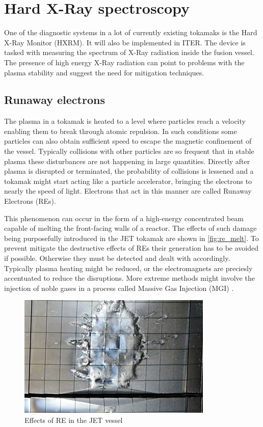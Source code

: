 \section{Hard X-Ray spectroscopy}

One of the diagnostic systems in a lot of currently existing tokamaks
is the Hard X-Ray Monitor (HXRM). It will also be implemented in ITER.
The device is tasked with measuring the spectrum of X-Ray radiation
inside the fusion vessel. The presence of high energy X-Ray
radiation can point to problems with the plasma stability and suggest the 
need for mitigation techniques.
\cite{low_noise_amplifier_for_pmt}

\subsection{Runaway electrons}

The plasma in a tokamak is heated to a level where particles reach a velocity
enabling them to break through atomic repulsion. In such conditions some 
particles can also obtain sufficient speed to escape the magnetic confinement
of the vessel. Typically collisions with other particles are so frequent
that in stable plasma these disturbances are not happening in large quantities.
Directly after plasma is disrupted or terminated, 
the probability of collisions is lessened 
and a tokamak might start acting like a particle accelerator,
bringing the electrons to nearly the speed of light.
Electrons that act in this manner are called Runaway Electrons (REs).
\cite{iter_re_melt}


This phenomenon can occur in the form of a high-energy 
concentrated beam capable of melting the front-facing walls of a reactor.
The effects of such damage being purposefully introduced in the JET tokamak
are shown in \autoref{fig:re_melt}. To prevent mitigate the destructive
effects of REs their generation has to be avoided if possible. Otherwise
they must be detected and dealt with accordingly. Typically plasma heating
might be reduced, or the electromagnets are preciesly accentuated
to reduce the disruptions. More extreme methods might 
involve the injection of noble gases in a process called 
Massive Gas Injection (MGI) \cite{massive_gas_injection}.
\begin{figure}[H]
  \centering
  \includegraphics[width=.7\linewidth]{media/re_melt.jpeg}
  \caption{Effects of RE in the JET vessel\cite{iter_re_melt}}
  \label{fig:re_melt}
\end{figure}


